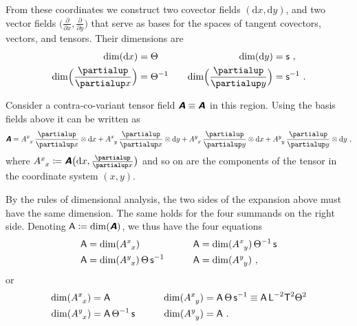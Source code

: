 \documentclass[\ifafour a4paper,12pt,\else a5paper,10pt,\fi%
onecolumn,oneside,article,%
british%
]{memoir}
\makeatletter
\theoremstyle{remark}
\theoremstyle{innote}
\newcommand*{\mathte}[1]{\textbf{\textit{\textsf{#1}}}}
\newcommand*{\de}{\partialup}%
\newcommand*{\di}{\mathrm{d}}%
\newcommand*{\defd}{\coloneqq}
\renewcommand*{\|}[1][]{\nonscript\,#1\vert\nonscript\;\mathopen{}}
\newcommand*{\q}{}%
\DeclareRobustCommand*{\q}{%
  \mathbin{\mathpalette\bigcdot@{}}%
}
\newcommand*{\bigcdot@scalefactor}{0.7}
\newcommand*{\bigcdot@widthfactor}{1.5}
\newcommand*{\bigcdot@}[2]{%
  \sbox0{$#1\vcenter{}$}%
  \sbox2{$#1\cdot\m@th$}%
  \hbox to \bigcdot@widthfactor\wd2{%
    \hfil
    \raise\ht0\hbox{%
      \scalebox{\bigcdot@scalefactor}{%
        \lower\ht0\hbox{$#1\bullet\m@th$}%
      }%
    }%
    \hfil
  }%
}
\newcommand*{\Le}{\textsf{L}}
\newcommand*{\Ti}{\textsf{T}}
\newcommand*{\Te}{\Theta}
\newcommand*{\Ent}{\textsf{s}}
\newcommand*{\Aa}{\textsf{A}}
\newcommand*{\yA}{\mathte{A}}
\renewcommand*{\i}{\indices}
\newcommand*{\dex}[1][i]{\frac{\de}{\de x^{#1}}}
\newcommand*{\dix}[1][i]{\di x^{#1}}
\makeatother
\begin{document}
From these coordinates we construct two covector fields $(\di x, \di y)$,
and two vector fields $\bigl(\frac{\de}{\de x}, \frac{\de}{\de y}\bigr)$
that serve as bases for the spaces of tangent covectors, vectors, and
tensors. Their dimensions are
\begin{equation}
  \label{eq:example_basisvects2d}
  \begin{aligned}
  \dim(\di x)&=\Te &\quad
                        \dim(\di y)&= \Ent \ ,
                                     \\
  \dim\Bigl(\frac{\de}{\de x}\Bigr)&=\Te^{-1} &\quad
                        \dim\Bigl(\frac{\de}{\de y}\Bigr)&= \Ent^{-1} \ .
  \end{aligned}
\end{equation}


Consider a contra-co-variant tensor field $\yA \equiv \yA\i{^{\q}_{\q}}$ in
this region. Using the basis fields above it can be written as
\begin{equation}
  \label{eq:expansion_tensor_2d}
  \yA = %
  A\i{^{x}_{x}}\,\frac{\de}{\de x} \otimes\di x + 
  A\i{^{x}_{y}}\,\frac{\de}{\de x} \otimes\di y + 
  A\i{^{y}_{x}}\,\frac{\de}{\de y} \otimes\di x + 
  A\i{^{y}_{y}}\,\frac{\de}{\de y} \otimes\di y \ ,
\end{equation}
where $A\i{^{x}_{x}} \defd \yA\bigl(\di x, \frac{\de}{\de x}\bigr)$ and so
on are the components of the tensor in the coordinate system $(x, y)$.

By the rules of dimensional analysis, the two sides of the expansion above
must have the same dimension. The same holds for the four summands on the
right side. Denoting $\Aa \defd \dim(\yA)$, we thus have the four equations
\begin{equation*}
  \label{eq:four_dims_2d_pre}
  \begin{aligned}
    \Aa &= \dim(A\i{^{x}_{x}}) &\qquad \Aa &=
 \dim(A\i{^{x}_{y}})\,\Te^{-1}\,\Ent 
 \\
    \Aa &= \dim(A\i{^{y}_{x}})\,\Te\,\Ent^{-1} &\qquad \Aa &=
 \dim(A\i{^{y}_{y}}) \ ,
  \end{aligned}
\end{equation*}
or
\begin{equation}
  \label{eq:four_dims_2d}
  \begin{aligned}
    \dim(A\i{^{x}_{x}}) &= \Aa\, &\qquad 
 \dim(A\i{^{x}_{y}}) &=\Aa\,\Te\,\Ent^{-1} \equiv
\Aa\,\Le^{-2}\Ti^{2}\Te^{2}
    \\
    \dim(A\i{^{y}_{x}}) &= \Aa\,\Te^{-1}\,\Ent &\qquad
 \dim(A\i{^{y}_{y}}) &= \Aa \ .
  \end{aligned}
\end{equation}
\end{document}
